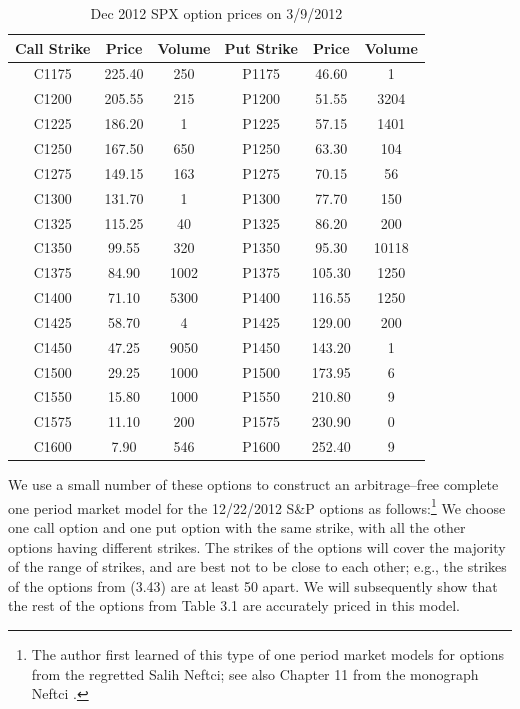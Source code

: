 \begin{table}[H]
\centering
\caption{Dec 2012 SPX option prices on 3/9/2012}
\begin{tabular}{|c|c|c||c|c|c|}
\hline
Call Strike & Price & Volume & Put Strike & Price & Volume \\
\hline
C1175 & 225.40 & 250  & P1175 & 46.60  & 1     \\
\hline
C1200 & 205.55 & 215  & P1200 & 51.55  & 3204  \\
\hline
C1225 & 186.20 & 1    & P1225 & 57.15  & 1401  \\
\hline
C1250 & 167.50 & 650  & P1250 & 63.30  & 104   \\
\hline
C1275 & 149.15 & 163  & P1275 & 70.15  & 56    \\
\hline
C1300 & 131.70 & 1    & P1300 & 77.70  & 150   \\
\hline
C1325 & 115.25 & 40   & P1325 & 86.20  & 200   \\
\hline
C1350 & 99.55  & 320  & P1350 & 95.30  & 10118 \\
\hline
C1375 & 84.90  & 1002 & P1375 & 105.30 & 1250  \\
\hline
C1400 & 71.10  & 5300 & P1400 & 116.55 & 1250  \\
\hline
C1425 & 58.70  & 4    & P1425 & 129.00 & 200   \\
\hline
C1450 & 47.25  & 9050 & P1450 & 143.20 & 1     \\
\hline
C1500 & 29.25  & 1000 & P1500 & 173.95 & 6     \\
\hline
C1550 & 15.80  & 1000 & P1550 & 210.80 & 9     \\
\hline
C1575 & 11.10  & 200  & P1575 & 230.90 & 0     \\
\hline
C1600 & 7.90   & 546  & P1600 & 252.40 & 9     \\
\hline
\end{tabular}
\end{table}

We use a small number of these options to construct an arbitrage--free
complete one period market model for the 12/22/2012 S\&P options as
follows:\footnote{The author first learned of this type of one period
market models for options from the regretted Salih Neftci; see also
Chapter 11 from the monograph Neftci \cite{31}.} We choose one call
option and one put option with the same strike, with all the other
options having different strikes. The strikes of the options will cover
the majority of the range of strikes, and are best not to be close to
each other; e.g., the strikes of the options from (3.43) are at least 50
apart. We will subsequently show that the rest of the options from
Table 3.1 are accurately priced in this model.
